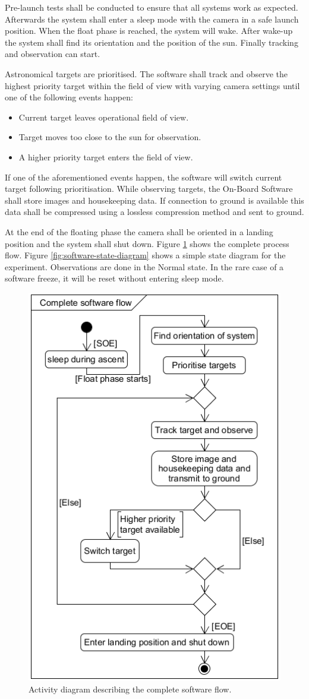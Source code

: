 Pre-launch tests shall be conducted to ensure that all systems work as expected. Afterwards the system shall enter a sleep mode with the camera in a safe launch position. When the float phase is reached, the system will wake. After wake-up the system shall find its orientation and the position of the sun. Finally tracking and observation can start.

Astronomical targets are prioritised. The software shall track and observe the highest priority target within the field of view with varying camera settings until one of the following events happen:

\begin{itemize}
	\item Current target leaves operational field of view.
	\item Target moves too close to the sun for observation.
	\item A higher priority target enters the field of view.
\end{itemize}

If one of the aforementioned events happen, the software will switch current target following prioritisation. While observing targets, the On-Board Software shall store images and housekeeping data. If connection to ground is available this data shall be compressed using a lossless compression method and sent to ground.

At the end of the floating phase the camera shall be oriented in a landing position and the system shall shut down. Figure \ref{fig:software-activity-diagram} shows the complete process flow. Figure \ref{fig:software-state-diagram} shows a simple state diagram for the experiment. Observations are done in the Normal state. In the rare case of a software freeze, it will be reset without entering sleep mode. 

\begin{figure}[H]
    \centering
    \includegraphics[width=.5\textwidth]{4-experiment-design/img/software/activity-diagram.png}
    \caption{Activity diagram describing the complete software flow.}
    \label{fig:software-activity-diagram}
\end{figure}

